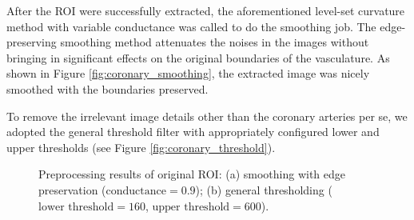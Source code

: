 After the ROI were successfully extracted, the aforementioned level-set curvature method with variable conductance \cite{Whitaker2001} was called to do the smoothing job.
The edge-preserving smoothing method attenuates the noises in the images without bringing in significant effects on the original boundaries of the vasculature.
As shown in Figure \ref{fig:coronary_smoothing}, the extracted image was nicely smoothed with the boundaries preserved.

To remove the irrelevant image details other than the coronary arteries per se, we adopted the general threshold filter with appropriately configured lower and upper thresholds (see Figure \ref{fig:coronary_threshold}). %
\begin{figure}[!tb]
\centering
{}
\hfil
{}
\caption{Preprocessing results of original ROI: (a) smoothing with edge preservation ($\text{conductance} = 0.9$); (b) general thresholding ($\text{lower threshold} = 160$, $\text{upper threshold} = 600$).}%
\label{fig:coronary_preprocessing}
\end{figure}

